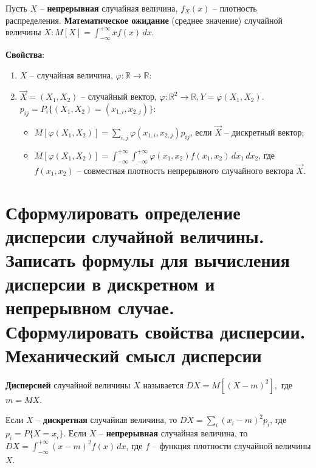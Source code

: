 Пусть $X$ -- \textbf{непрерывная} случайная величина, $f_X(x)$ -- плотность распределения. \textbf{Математическое ожидание} (среднее значение) случайной величины $X: M[X] = \int_{-\infty}^{+\infty} xf(x)\, dx$.

\clearpage

\textbf{Свойства}:
\begin{enumerate}
	\item $X$ -- случайная величина, $\varphi: \mathbb{R} \rightarrow \mathbb{R}$:
	\begin{itemize}
		\item $M[\varphi(X)] = \sum_{i} \varphi(x_i)p_i$, если $X$ -- дискретная случайная величина;
		\item}$M[\varphi(X)] = \int_{-\infty}^{+\infty} \varphi(x)f(x) \, dx$, если $X$ -- непрерывная случайная величина, $f(x)$ -- плотность;
	\end{itemize}
	\item $\vec{X} = (X_1, X_2)$ -- случайный вектор, $\varphi: \mathbb{R}^2 \rightarrow \mathbb{R}, Y = \varphi(X_1, X_2)$. $p_{ij} = P_i\{(X_1, X_2) = (x_{1, i}, x_{2, j})\}$:
	\begin{itemize}
		\item $M[\varphi(X_1, X_2)] = \sum_{i, j} \varphi (x_{1, i}, x_{2, j})p_{ij}$, если $\vec{X}$ -- дискретный вектор;
		\item $M[\varphi(X_1, X_2)] = \int_{-\infty}^{+\infty} \int_{-\infty}^{+\infty} \varphi(x_1, x_2)f(x_1, x_2) \, dx_1 \, dx_2$, где $f(x_1, x_2)$ -- совместная плотность непрерывного случайного вектора $\vec{X}$.
	\end{itemize}
\end{enumerate}

\section{Сформулировать определение дисперсии случайной величины. Записать формулы для вычисления дисперсии в дискретном и непрерывном случае. Сформулировать свойства дисперсии. Механический смысл дисперсии}

\textbf{Дисперсией} случайной величины $X$ называется $DX = M[(X-m)^2],$ где $m=MX$.

Если $X$ -- \textbf{дискретная} случайная величина, то $DX = \sum_{i} (x_i - m)^2 p_i$, где $p_i = P\{X=x_i\}$. Если  $X$ -- \textbf{непрерывная} случайная величина, то $DX = \int_{-\infty}^{+\infty} (x-m)^2f(x) \, dx$, где $f$ -- функция плотности случайной величины $X$.

